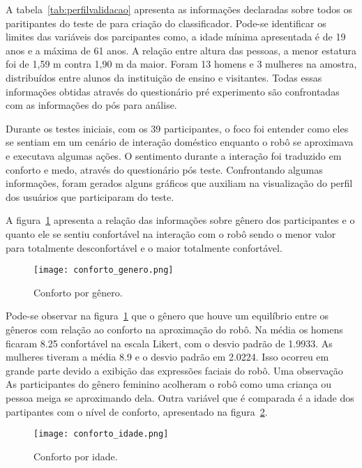 A tabela~\ref{tab:perfilvalidacao} apresenta as informações declaradas sobre todos os paritipantes do teste de para criação do classificador. Pode-se identificar os limites das variáveis dos parcipantes como, a idade mínima apresentada é de 19 anos e a máxima de 61 anos. A relação entre altura das pessoas, a menor estatura foi de 1,59 m contra 1,90 m da maior. Foram 13 homens e 3 mulheres na amostra, distribuídos entre alunos da instituição de ensino e visitantes. Todas essas informações obtidas através do questionário pré experimento são confrontadas com as informações do pós para análise.

Durante os testes iniciais, com os 39 participantes, o foco foi entender como eles se sentiam em um cenário de interação doméstico enquanto o robô se aproximava e executava algumas ações. O sentimento durante a interação foi traduzido em conforto e medo, através do questionário pós teste. Confrontando algumas informações, foram gerados alguns gráficos que auxiliam na visualização do perfil dos usuários que participaram do teste.

A figura~\ref{fig:confortogenero} apresenta a relação das informações sobre gênero dos participantes e o quanto ele se sentiu confortável na interação com o robô sendo o menor valor para totalmente desconfortável e o maior totalmente confortável.

\begin{figure}[ht!]
	\centering
	\begin{minipage}{0.65\textwidth}
		\caption{Conforto por gênero.}
		\texttt{[image: conforto\_genero.png]}
		\label{fig:confortogenero}
	\end{minipage}
\end{figure}

Pode-se observar na figura~\ref{fig:confortogenero} que o gênero que houve um equilíbrio entre os gêneros com relação ao conforto na aproximação do robô. Na média os homens ficaram 8.25 confortável na escala Likert, com o desvio padrão de 1.9933. As mulheres tiveram a média 8.9 e o desvio padrão em 2.0224. Isso ocorreu em grande parte devido a exibição das expressões faciais do robô. Uma observação As participantes do gênero feminino acolheram o robô como uma criança ou pessoa meiga se aproximando dela. Outra variável que é comparada é a idade dos partipantes com o nível de conforto, apresentado na figura~\ref{fig:confortoidade}.

\begin{figure}[ht!]
	\centering
	\begin{minipage}{0.65\textwidth}
		\caption{Conforto por idade.}
		\texttt{[image: conforto\_idade.png]}
		\label{fig:confortoidade}
	\end{minipage}
\end{figure}

